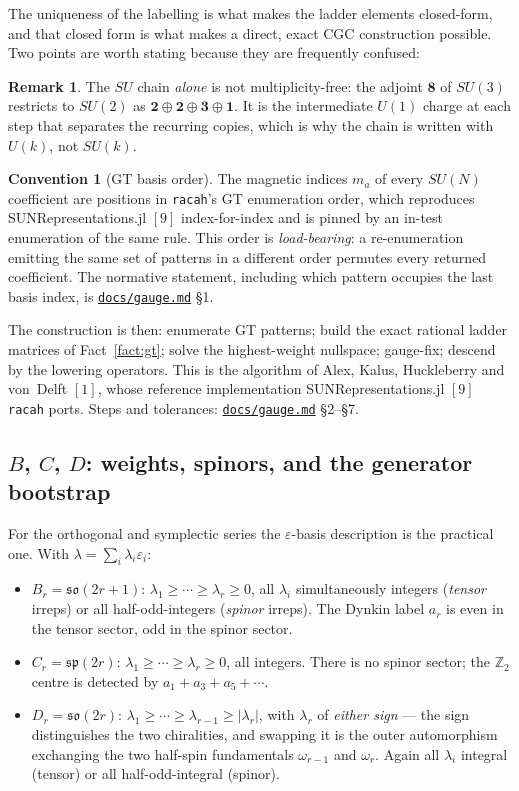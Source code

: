 \documentclass[11pt,a4paper]{article}
\theoremstyle{plain}
\theoremstyle{definition}
\newtheorem{convention}[theorem]{Convention}
\newtheorem{remark}[theorem]{Remark}
\newcommand{\so}{\mathfrak{so}}
\newcommand{\symp}{\mathfrak{sp}}
\newcommand{\ZZ}{\mathbb{Z}}
\newcommand{\code}[1]{\texttt{#1}}
\newcommand{\gaugemd}{\href{https://github.com/Ryo-wtnb11/fusion-symbols/blob/main/docs/gauge.md}{\code{docs/gauge.md}}}
\begin{document}
The uniqueness of the labelling is what makes the ladder elements closed-form,
and that closed form is what makes a direct, exact CGC construction possible.
Two points are worth stating because they are frequently confused:

\begin{remark}
The $SU$ chain \emph{alone} is not multiplicity-free: the adjoint $\mathbf{8}$
of $SU(3)$ restricts to $SU(2)$ as
$\mathbf{2}\oplus\mathbf{2}\oplus\mathbf{3}\oplus\mathbf{1}$. It is the
intermediate $U(1)$ charge at each step that separates the recurring copies,
which is why the chain is written with $U(k)$, not $SU(k)$.
\end{remark}

\begin{convention}[GT basis order]
The magnetic indices $m_a$ of every $SU(N)$ coefficient are positions in
\code{racah}'s GT enumeration order, which reproduces
SUNRepresentations.jl $[9]$ index-for-index and is pinned by an in-test
enumeration of the same rule. This order is \emph{load-bearing}: a re-enumeration emitting the same
set of patterns in a different order permutes every returned coefficient. The
normative statement, including which pattern occupies the last basis index, is
\gaugemd{} \S1.
\end{convention}

The construction is then: enumerate GT patterns; build the exact rational
ladder matrices of Fact~\ref{fact:gt}; solve the highest-weight nullspace;
gauge-fix; descend by the lowering operators. This is the algorithm of Alex,
Kalus, Huckleberry and von~Delft $[1]$, whose reference implementation
SUNRepresentations.jl $[9]$ \code{racah} ports. Steps and tolerances:
\gaugemd{} \S2--\S7.

\subsection{$B$, $C$, $D$: weights, spinors, and the generator bootstrap}
\label{sec:bcd}

For the orthogonal and symplectic series the $\varepsilon$-basis description is
the practical one. With $\lambda = \sum_i \lambda_i\varepsilon_i$:

\begin{itemize}[leftmargin=1.4em]
  \item $B_r = \so(2r+1)$: $\lambda_1\ge\cdots\ge\lambda_r\ge 0$, all
    $\lambda_i$ simultaneously integers (\emph{tensor} irreps) or all
    half-odd-integers (\emph{spinor} irreps). The Dynkin label $a_r$ is even in
    the tensor sector, odd in the spinor sector.
  \item $C_r = \symp(2r)$: $\lambda_1\ge\cdots\ge\lambda_r\ge 0$, all integers.
    There is no spinor sector; the $\ZZ_2$ centre is detected by
    $a_1+a_3+a_5+\cdots$.
  \item $D_r = \so(2r)$: $\lambda_1\ge\cdots\ge\lambda_{r-1}\ge|\lambda_r|$,
    with $\lambda_r$ of \emph{either sign} --- the sign distinguishes the two
    chiralities, and swapping it is the outer automorphism exchanging the two
    half-spin fundamentals $\omega_{r-1}$ and $\omega_r$. Again all $\lambda_i$
    integral (tensor) or all half-odd-integral (spinor).
\end{itemize}
\end{document}
